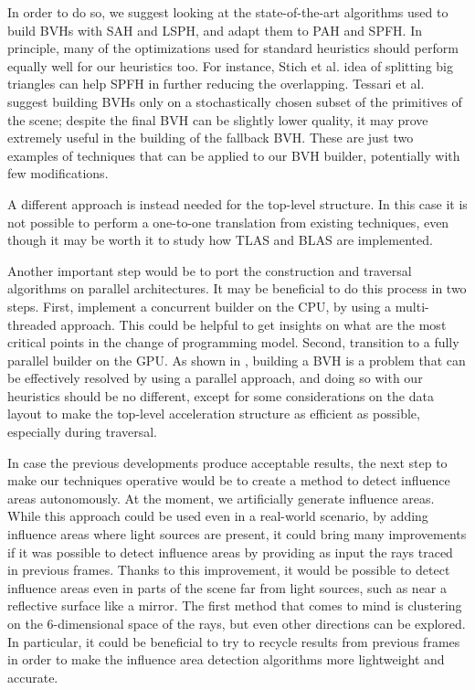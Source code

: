 \documentclass[acmtog, anonymous, review]{acmart}
\begin{document}
In order to do so, we suggest looking at the state-of-the-art algorithms used to build BVHs with SAH and LSPH, and adapt them to PAH and SPFH. In principle, many of the optimizations used for standard heuristics should perform equally well for our heuristics too. For instance, Stich et al. \cite{bvh_spatial_splits} idea of splitting big triangles can help SPFH in further reducing the overlapping. Tessari et al. \cite{stochastic_bvh_construction} suggest building BVHs only on a stochastically chosen subset of the primitives of the scene; despite the final BVH can be slightly lower quality, it may prove extremely useful in the building of the fallback BVH. These are just two examples of techniques that can be applied to our BVH builder, potentially with few modifications. 

A different approach is instead needed for the top-level structure. In this case it is not possible to perform a one-to-one translation from existing techniques, even though it may be worth it to study how TLAS and BLAS \cite{tlas_blas} are implemented.

Another important step would be to port the construction and traversal algorithms on parallel architectures. It may be beneficial to do this process in two steps. First, implement a concurrent builder on the CPU, by using a multi-threaded approach. This could be helpful to get insights on what are the most critical points in the change of programming model. Second, transition to a fully parallel builder on the GPU. As shown in \cite{parallel_bvh}, building a BVH is a problem that can be effectively resolved by using a parallel approach, and doing so with our heuristics should be no different, except for some considerations on the data layout to make the top-level acceleration structure as efficient as possible, especially during traversal.

In case the previous developments produce acceptable results, the next step to make our techniques operative would be to create a method to detect influence areas autonomously. At the moment, we artificially generate influence areas. While this approach could be used even in a real-world scenario, by adding influence areas where light sources are present, it could bring many improvements if it was possible to detect influence areas by providing as input the rays traced in previous frames. Thanks to this improvement, it would be possible to detect influence areas even in parts of the scene far from light sources, such as near a reflective surface like a mirror. The first method that comes to mind is clustering on the 6-dimensional space of the rays, but even other directions can be explored. In particular, it could be beneficial to try to recycle results from previous frames in order to make the influence area detection algorithms more lightweight and accurate.
\end{document}
